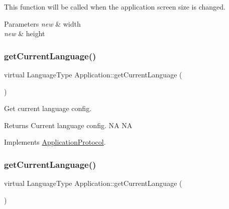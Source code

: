 This function will be called when the application screen size is changed. 


\begin{DoxyParams}{Parameters}
{\em new} & width \\
\hline
{\em new} & height \\
\hline
\end{DoxyParams}
\mbox{\label{classApplication_a3fd3aeff0465fffe782af5b1441131c6}} 
\subsubsection{\texorpdfstring{get\+Current\+Language()}{getCurrentLanguage()}\hspace{0.1cm}{\footnotesize\ttfamily [1/12]}}
{\footnotesize\ttfamily virtual Language\+Type Application\+::get\+Current\+Language (\begin{DoxyParamCaption}{ }\end{DoxyParamCaption})\hspace{0.3cm}{\ttfamily [virtual]}}



Get current language config. 

\begin{DoxyReturn}{Returns}
Current language config.  NA  NA 
\end{DoxyReturn}


Implements \hyperlink{classApplicationProtocol_a44034ed02f9dd0fc59264f74f9ef9b17}{Application\+Protocol}.

\mbox{\label{classApplication_a3fd3aeff0465fffe782af5b1441131c6}} 
\subsubsection{\texorpdfstring{get\+Current\+Language()}{getCurrentLanguage()}\hspace{0.1cm}{\footnotesize\ttfamily [2/12]}}
{\footnotesize\ttfamily virtual Language\+Type Application\+::get\+Current\+Language (\begin{DoxyParamCaption}{ }\end{DoxyParamCaption})\hspace{0.3cm}{\ttfamily [virtual]}}



